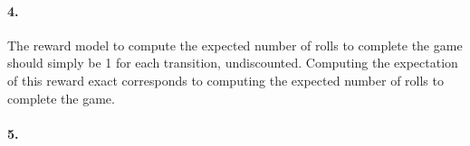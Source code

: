 \documentclass[12pt]{article}
\begin{document}
\paragraph{4.}
The reward model to compute the expected number of rolls to complete the game should simply be 1 for each transition, undiscounted. Computing the expectation of this reward exact corresponds to computing the expected number of rolls to complete the game.

\paragraph{5.}
\end{document}

